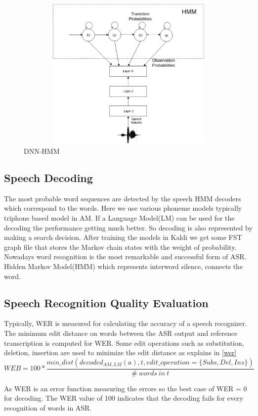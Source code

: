 \documentclass{standalone}
\begin{document}
\begin{figure}[h]
 \centering
 \centerline{\includegraphics[width=13cm, height=7.5cm]{img/DNN-HMM.pdf}}
 \caption{DNN-HMM}
\label{fig:dnn}
\end{figure}
 
 
\subsection{Speech Decoding}
The most probable word sequences are detected by the speech HMM decoders which correspond to the words. Here we use various phoneme models typically triphone based model in AM. If a Language Model(LM) can be used for the decoding the performance getting much better. So decoding is also represented by making a search decision. After training the models in Kaldi we get some FST graph file that stores the Markov chain states with the weight of probability.\\
Nowadays word recognition is the most remarkable and successful form of ASR. Hidden Markov Model(HMM) which represents interword silence, connects the word.

  
\subsection{Speech Recognition Quality Evaluation}
Typically, WER is measured for calculating the accuracy of a speech recognizer. The minimum edit distance on words between the ASR output and reference transcription is computed for WER. Some edit operations such as substitution, deletion, insertion are used to minimize the edit distance as explains in \ref{wer} \\

\begin{equation} \label{wer}
    WEB=100*\frac{min\_dist(decoded_{AM,LM}(a),t,edit\_operation=\{Subs,Del,Ins\})}{\#\ words\ in\ t}
\end{equation}

As WER is an error function measuring the errors so the best case of WER = 0 for decoding. The WER value of 100 indicates that the decoding fails for every recognition of words in ASR.  
\end{document}
